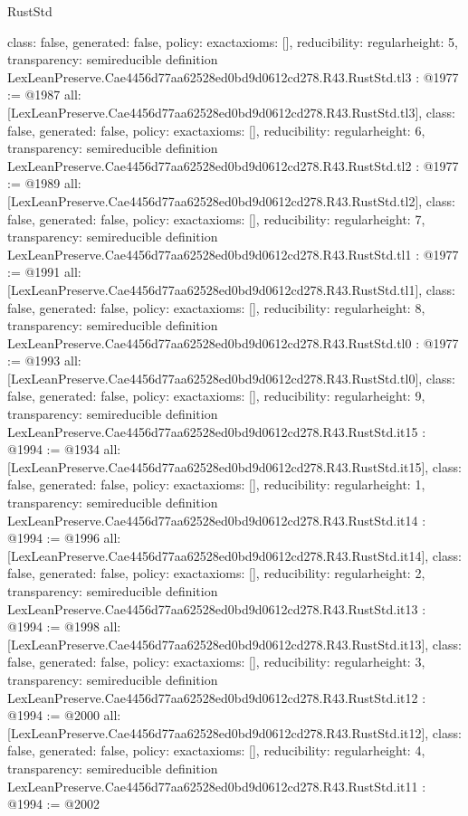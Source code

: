 \begin{lexlean}{RustStd}
\begin{coremodule}
{  class: false,
  generated: false,
  policy: exact{axioms: []},
  reducibility: regular{height: 5},
  transparency: semireducible
}
definition LexLeanPreserve.Cae4456d77aa62528ed0bd9d0612cd278.R43.RustStd.tl3 : @1977 := @1987 {
  all: [LexLeanPreserve.Cae4456d77aa62528ed0bd9d0612cd278.R43.RustStd.tl3],
  class: false,
  generated: false,
  policy: exact{axioms: []},
  reducibility: regular{height: 6},
  transparency: semireducible
}
definition LexLeanPreserve.Cae4456d77aa62528ed0bd9d0612cd278.R43.RustStd.tl2 : @1977 := @1989 {
  all: [LexLeanPreserve.Cae4456d77aa62528ed0bd9d0612cd278.R43.RustStd.tl2],
  class: false,
  generated: false,
  policy: exact{axioms: []},
  reducibility: regular{height: 7},
  transparency: semireducible
}
definition LexLeanPreserve.Cae4456d77aa62528ed0bd9d0612cd278.R43.RustStd.tl1 : @1977 := @1991 {
  all: [LexLeanPreserve.Cae4456d77aa62528ed0bd9d0612cd278.R43.RustStd.tl1],
  class: false,
  generated: false,
  policy: exact{axioms: []},
  reducibility: regular{height: 8},
  transparency: semireducible
}
definition LexLeanPreserve.Cae4456d77aa62528ed0bd9d0612cd278.R43.RustStd.tl0 : @1977 := @1993 {
  all: [LexLeanPreserve.Cae4456d77aa62528ed0bd9d0612cd278.R43.RustStd.tl0],
  class: false,
  generated: false,
  policy: exact{axioms: []},
  reducibility: regular{height: 9},
  transparency: semireducible
}
definition LexLeanPreserve.Cae4456d77aa62528ed0bd9d0612cd278.R43.RustStd.it15 : @1994 := @1934 {
  all: [LexLeanPreserve.Cae4456d77aa62528ed0bd9d0612cd278.R43.RustStd.it15],
  class: false,
  generated: false,
  policy: exact{axioms: []},
  reducibility: regular{height: 1},
  transparency: semireducible
}
definition LexLeanPreserve.Cae4456d77aa62528ed0bd9d0612cd278.R43.RustStd.it14 : @1994 := @1996 {
  all: [LexLeanPreserve.Cae4456d77aa62528ed0bd9d0612cd278.R43.RustStd.it14],
  class: false,
  generated: false,
  policy: exact{axioms: []},
  reducibility: regular{height: 2},
  transparency: semireducible
}
definition LexLeanPreserve.Cae4456d77aa62528ed0bd9d0612cd278.R43.RustStd.it13 : @1994 := @1998 {
  all: [LexLeanPreserve.Cae4456d77aa62528ed0bd9d0612cd278.R43.RustStd.it13],
  class: false,
  generated: false,
  policy: exact{axioms: []},
  reducibility: regular{height: 3},
  transparency: semireducible
}
definition LexLeanPreserve.Cae4456d77aa62528ed0bd9d0612cd278.R43.RustStd.it12 : @1994 := @2000 {
  all: [LexLeanPreserve.Cae4456d77aa62528ed0bd9d0612cd278.R43.RustStd.it12],
  class: false,
  generated: false,
  policy: exact{axioms: []},
  reducibility: regular{height: 4},
  transparency: semireducible
}
definition LexLeanPreserve.Cae4456d77aa62528ed0bd9d0612cd278.R43.RustStd.it11 : @1994 := @2002 {
}
\end{coremodule}
\end{lexlean}
